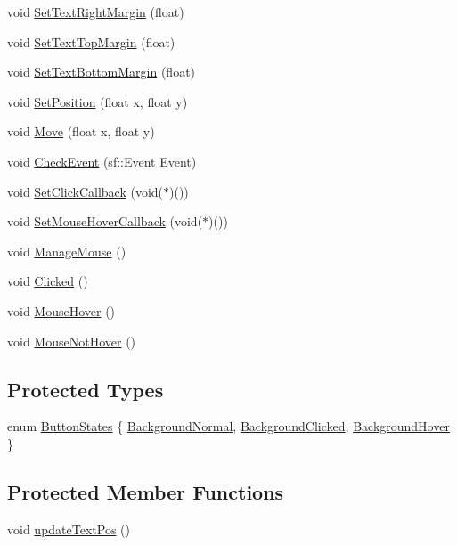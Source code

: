 \begin{CompactItemize}
void \hyperlink{classsfgui_1_1Object_dcea61673771a680fc47e4b838c2a59e}{SetTextRightMargin} (float)
\item 
void \hyperlink{classsfgui_1_1Object_6c3eb411a957d05707d858ded4cd951c}{SetTextTopMargin} (float)
\item 
void \hyperlink{classsfgui_1_1Object_db61eb19249fbbd28462cc79ca17b738}{SetTextBottomMargin} (float)
\item 
void \hyperlink{classsfgui_1_1Object_664c57bd35504a7d00963980d68dd022}{SetPosition} (float x, float y)
\item 
void \hyperlink{classsfgui_1_1Object_70b15fba99da515808d3da7d8042f458}{Move} (float x, float y)
\item 
void \hyperlink{classsfgui_1_1Object_cd9dbf2abe79e04c22f281bccb8bdb0e}{CheckEvent} (sf::Event Event)
\item 
void \hyperlink{classsfgui_1_1Object_d3d20a4cccde599748db724236ca0826}{SetClickCallback} (void($\ast$)())
\item 
void \hyperlink{classsfgui_1_1Object_8317dbdf44797dd69de490d4b946ed83}{SetMouseHoverCallback} (void($\ast$)())
\item 
void \hyperlink{classsfgui_1_1Object_3332575d988f9eee589f57b2ad516593}{ManageMouse} ()
\item 
void \hyperlink{classsfgui_1_1Object_da7f84701d318ce93fe59cc2f571eaf2}{Clicked} ()
\item 
void \hyperlink{classsfgui_1_1Object_68d1941ad05b3d0bdf2ba85702c04cc0}{MouseHover} ()
\item 
void \hyperlink{classsfgui_1_1Object_24575661efb4ab88be76eb2e1a4947e6}{MouseNotHover} ()
\end{CompactItemize}
\subsection*{Protected Types}
\begin{CompactItemize}
\item 
enum \hyperlink{classsfgui_1_1Object_8a7d7ae20a88b7ef8a104f7e6c8596ce}{ButtonStates} \{ \hyperlink{classsfgui_1_1Object_8a7d7ae20a88b7ef8a104f7e6c8596cee8211d79a1f35d08db2b31a914bddc38}{BackgroundNormal}, 
\hyperlink{classsfgui_1_1Object_8a7d7ae20a88b7ef8a104f7e6c8596ce03b529b6f0fee7ab7cc0033441180b67}{BackgroundClicked}, 
\hyperlink{classsfgui_1_1Object_8a7d7ae20a88b7ef8a104f7e6c8596ce9befc9dbae9107e3e7546af33a139df9}{BackgroundHover}
 \}
\end{CompactItemize}
\subsection*{Protected Member Functions}
\begin{CompactItemize}
\item 
void \hyperlink{classsfgui_1_1Object_27d9eb8b653f263f76b612cd77512321}{updateTextPos} ()
\end{CompactItemize}
